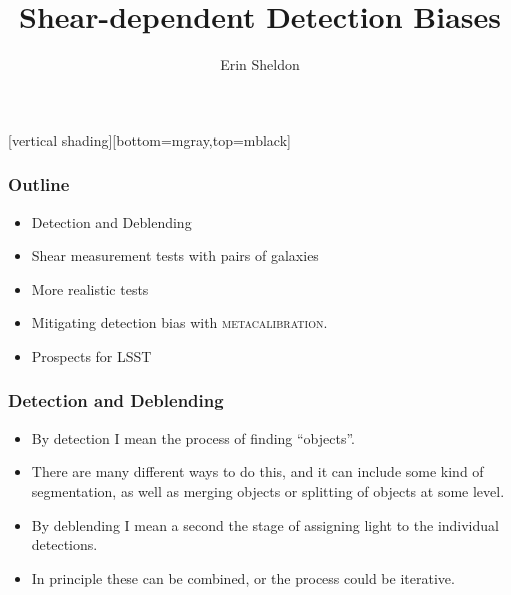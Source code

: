 \documentclass{beamer}
\title{Shear-dependent Detection Biases}
\author{Erin Sheldon}
\institute{Brookhaven National Laboratory}
\newcommand{\mcal}{\textsc{metacalibration}}
\begin{document}
\frame
{
}




\frame{\titlepage}

[vertical shading][bottom=mgray,top=mblack]





\frame
{
    \frametitle{Outline}

    \begin{itemize}

        \item Detection and Deblending
        \item Shear measurement tests with pairs of galaxies
        \item More realistic tests
        \item Mitigating detection bias with \mcal.
        \item Prospects for LSST

    \end{itemize}

}

\frame
{
    \frametitle{Detection and Deblending}

 
    \begin{itemize}

        \item By detection I mean the process of finding ``objects''.

        \item There are many different ways to do this, and it can include some
            kind of segmentation, as well as merging objects or splitting of
            objects at some level.

        \item By deblending I mean a second the stage of assigning light to the
            individual detections.

        \item In principle these can be combined, or the process could be iterative.

    \end{itemize}

}
\end{document}
